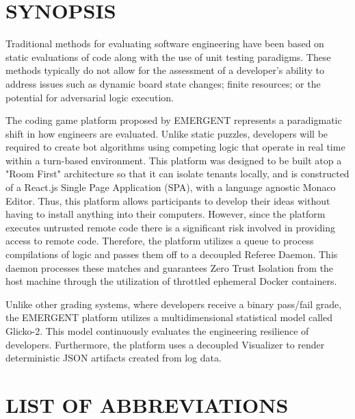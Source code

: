 \documentclass[12pt,a4paper]{report}
\begin{document}

\chapter*{SYNOPSIS}

Traditional methods for evaluating software engineering have been based on static evaluations of code along with the use of unit testing paradigms. These methods typically do not allow for the assessment of a developer's ability to address issues such as dynamic board state changes; finite resources; or the potential for adversarial logic execution.

The coding game platform proposed by EMERGENT represents a paradigmatic shift in how engineers are evaluated. Unlike static puzzles, developers will be required to create bot algorithms using competing logic that operate in real time within a turn-based environment. This platform was designed to be built atop a "Room First" architecture so that it can isolate tenants locally, and is constructed of a React.js Single Page Application (SPA), with a language agnostic Monaco Editor. Thus, this platform allows participants to develop their ideas without having to install anything into their computers. However, since the platform executes untrusted remote code there is a significant risk involved in providing access to remote code. Therefore, the platform utilizes a queue to process compilations of logic and passes them off to a decoupled Referee Daemon. This daemon processes these matches and guarantees Zero Trust Isolation from the host machine through the utilization of throttled ephemeral Docker containers.

Unlike other grading systems, where developers receive a binary pass/fail grade, the EMERGENT platform utilizes a multidimensional statistical model called Glicko-2. This model continuously evaluates the engineering resilience of developers. Furthermore, the platform uses a decoupled Visualizer to render deterministic JSON artifacts created from log data.
\newpage
\setcounter{tocdepth}{1} %
\tableofcontents
\newpage
\listoffigures
\newpage
\listoftables

\chapter*{LIST OF ABBREVIATIONS}
\end{document}
